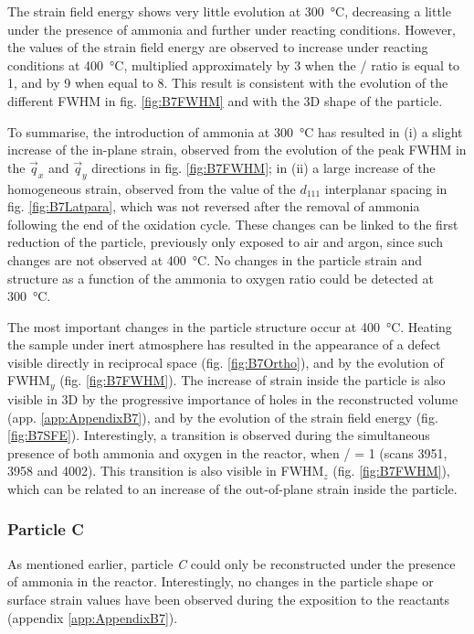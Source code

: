 The strain field energy shows very little evolution at \qty{300}{\degreeCelsius}, decreasing a little under the presence of ammonia and further under reacting conditions.
However, the values of the strain field energy are observed to increase under reacting conditions at \qty{400}{\degreeCelsius}, multiplied approximately by \num{3} when the / ratio is equal to 1, and by \num{9} when equal to 8.
This result is consistent with the evolution of the different FWHM in fig. \ref{fig:B7FWHM} and with the 3D shape of the particle.

To summarise, the introduction of ammonia at \qty{300}{\degreeCelsius} has resulted in (i) a slight increase of the in-plane strain, observed from the evolution of the peak FWHM in the $\vec{q}_x$ and $\vec{q}_y$ directions in fig. \ref{fig:B7FWHM}; in (ii) a large increase of the homogeneous strain, observed from the value of the $d_{111}$ interplanar spacing in fig. \ref{fig:B7Latpara}, which was not reversed after the removal of ammonia following the end of the oxidation cycle.
These changes can be linked to the first reduction of the particle, previously only exposed to air and argon, since such changes are not observed at \qty{400}{\degreeCelsius}.
No changes in the particle strain and structure as a function of the ammonia to oxygen ratio could be detected at \qty{300}{\degreeCelsius}.

The most important changes in the particle structure occur at \qty{400}{\degreeCelsius}.
Heating the sample under inert atmosphere has resulted in the appearance of a defect visible directly in reciprocal space (fig. \ref{fig:B7Ortho}), and by the evolution of FWHM$_y$ (fig. \ref{fig:B7FWHM}).
The increase of strain inside the particle is also visible in 3D by the progressive importance of holes in the reconstructed volume (app. \ref{app:AppendixB7}), and by the evolution of the strain field energy (fig. \ref{fig:B7SFE}).
Interestingly, a transition is observed during the simultaneous presence of both ammonia and oxygen in the reactor, when / = 1 (scans 3951, 3958 and 4002).
This transition is also visible in FWHM$_z$ (fig. \ref{fig:B7FWHM}), which can be related to an increase of the out-of-plane strain inside the particle.

\subsubsection{Particle C}

As mentioned earlier, particle \textit{C} could only be reconstructed under the presence of ammonia in the reactor.
Interestingly, no changes in the particle shape or surface strain values have been observed during the exposition to the reactants (appendix \ref{app:AppendixB7}).

